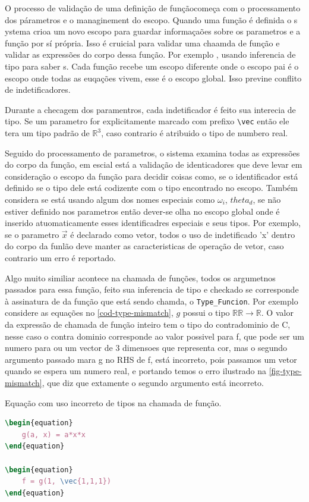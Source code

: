 O processo de validação de uma definição de funçãocomeça com o processamento dos párametros e o managinement do escopo. Quando uma função é definida o s ystema crioa um novo escopo para guardar informaçaões sobre os parametros e a função por sí própria. Isso é cruicial para validar uma chaamda de função e validar as expressões do corpo dessa função. Por exemplo , usando inferencia de tipo para saber s. Cada função recebe um escopo diferente onde o escopo pai é o escopo onde todas as euqações vivem, esse é o escopo global. Isso previne conflito de indetificadores.

Durante a checagem dos paramentros, cada indetificador é feito sua interecia de tipo. Se um parametro for explicitamente marcado com prefixo \verb`\vec`  então ele tera um tipo padrão de $\mathbb{R}^3$, caso contrario é atribuido o tipo de numbero real. 

Seguido do processamento de parametros, o sistema examina todas as expressões do corpo da função, em escial está a validação de identicadores que deve levar em consideração o escopo da função para decidir coisas como, se o identificador está definido se o tipo dele está codizente com o tipo encontrado no escopo. Também considera se está usando algum dos nomes especiais como $\omega_i$, $theta_d$, se não estiver definido nos parametros então dever-se olha no escopo global onde é inserido atuomaticamente esses identificadres especiais e seus tipos. Por exemplo, se o parametro $\vec{x}$ é declarado como vetor, todos o uso de indetificado 'x' dentro do corpo da funlão deve manter as caracteristicas de operação de vetor, caso contrario um erro é reportado.

Algo muito similiar acontece na chamada de funções, todos os argumetnos passados para essa função, feito sua inferencia de tipo e checkado se corresponde à assinatura de da função que está sendo chamda, o \verb`Type_Funcion`.
Por exemplo considere as equações no \autoref{cod-type-mismatch}, $g$ possui o tipo $\mathbb{R}\mathbb{R} \to \mathbb{R}$. O valor da expressão de chamada de função inteiro tem o tipo do contradominio de C, nesse caso o contra dominio corresponde ao valor possivel para f, que pode ser um numero para ou um vector de 3 dimensoes que representa cor, mas o segundo argumento passado mara g no RHS de f, está incorreto, pois passamos um vetor quando se espera um numero real, e portando temos o erro ilustrado na \autoref{fig-type-mismatch}, que diz que extamente o segundo argumento está incorreto.
\begin{codigo}[htb]
    \caption{\small Equação com uso incorreto de tipos na chamada de função. }
    \label{cod-type-mismatch}
\begin{lstlisting}[language=tex, numbers=none, frame=none, inputencoding=latin1]
\begin{equation}
    g(a, x) = a*x*x
\end{equation}

\begin{equation}
    f = g(1, \vec{1,1,1})
\end{equation}

\end{lstlisting}
\end{codigo}

